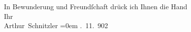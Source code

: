\pstart
           In Bewunderung und Freundſchaft drück ich Ihnen die Hand{\\[\baselineskip]}Ihr{\\[\baselineskip]}\spacefill\mbox{Arthur Schnitzler}\pend
           \leftskip=0em{}
. 11. 902\pend
           \endnumbering{}  \newcommand{\dateiname}{L01254}\newcommand{\titel}{Arthur Schnitzler an Gerhart Hauptmann, 30. 11. 1902}\newcommand{\editorInnen}{Martin Anton Müller und Gerd-Hermann Susen}

